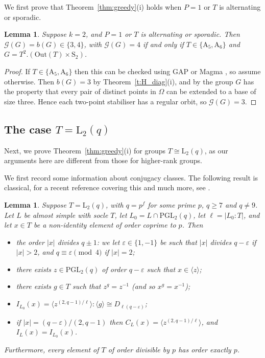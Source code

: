 \documentclass[twoside,a4paper,reqno,11pt]{amsart}
\newcommand{\e}{\varepsilon}
\newcommand{\<}{\langle}
\renewcommand{\>}{\rangle}
\newcommand{\la}{\langle}
\newcommand{\ra}{\rangle}
\newcommand{\geqs}{\geqslant}
\newcommand{\Out}{\mathrm{Out}}
\newcommand{\PGL}{\mathrm{PGL}}
\newcommand{\LL}{\mathrm{L}}
\newcommand{\Sn}{\mathrm{S}}
\newcommand{\An}{\mathrm{A}}
\newtheorem{lem}[thm]{Lemma}
\theoremstyle{definition}
\begin{document}
We first prove that Theorem~\ref{thm:greedy}(i) holds when
$P = 1$ or  $T$ is alternating or sporadic.

\begin{lem}
	\label{l:k=2_greedy_alt_spo}
	Suppose $k = 2$, and $P = 1$ or $T$ is alternating or sporadic. Then $\mathcal{G}(G) = b(G) \in \{3, 4\}$, with $\mathcal{G}(G) = 4$ if and only if $T \in \{\An_5, \An_6\}$ and $G = T^2.(\Out(T) \times \Sn_2)$.%
\end{lem}

\begin{proof}
    If $T  \in\{ \An_5, \An_6\}$ then this can be checked using \textsf{GAP} \cite{GAP} or {\sc Magma} \cite{MAGMA}, so assume otherwise. Then $b(G) = 3$ by Theorem~\ref{t:H_diag}(i), and 
	by \cite[Propositions 3.8, 3.14 and 3.15]{FHLR_Saxl} the group $G$ has the property that every pair of distinct points in $\Omega$ can be extended to a base of size three. Hence each two-point stabiliser has a regular orbit, so $\mathcal{G}(G) = 3$.
\end{proof}


\subsection{The case $T = \LL_2(q)$}
Next, we prove Theorem~\ref{thm:greedy}(i) for groups $T \cong  \LL_2(q)$, as our arguments here are different from those for higher-rank groups. 


We first record some information about conjugacy classes. The following result %
is classical, for a recent reference covering this and much more, see \cite[Chapter 2]{deFranceschiLiebeckOBrien}. 

\begin{lem}
    \label{l:k=2_inv_L2}
    Suppose $T = \LL_2(q)$, with $q = p^f$ for some prime $p$,  $q\geqs 7$ and $q\ne 9$. Let $L$ be almost simple with socle $T$, let $L_0 = L\cap \PGL_2(q)$, let $\ell = |L_0:T|$, and let $x\in T$ be a non-identity element of order coprime to $p$. Then
    \begin{itemize}\addtolength{\itemsep}{0.2\baselineskip}
        \item[{\rm (i)}] the order $|x|$ divides $q \pm 1$: we let $\e \in \{1, -1\}$ be such that $|x|$ divides $q - \e$ if $|x| > 2$, and $q \equiv \e \pmod 4$ if $|x| = 2$;
        \item[{\rm (ii)}] there exists $z\in\PGL_2(q)$ of order $q-\e$ such that $x\in\la z\ra$;
        \item[{\rm (iii)}] there exists $g\in T$ such that $z^g = z^{-1}$ (and so $x^g = x^{-1}$);
        \item[{\rm (iv)}] $I_{L_0}(x) = \la z^{(2,q-1)/\ell}\ra{:}\la g\ra\cong D_{\ell(q-\e)}$;
        \item[{\rm (v)}] if $|x| = (q-\e)/(2,q-1)$ then $C_L(x) = \la z^{(2,q-1)/\ell}\ra$,
        and $I_L(x) = I_{L_0}(x)$.
   \end{itemize}
        Furthermore, every element of $T$ of order divisible by $p$ has order exactly $p$.
\end{lem}
\end{document}
